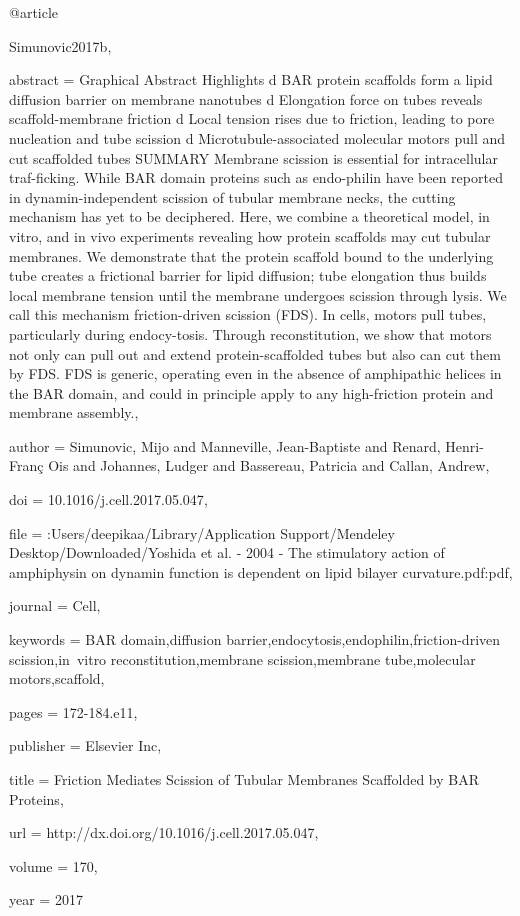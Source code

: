 @article{Simunovic2017b,

abstract = {Graphical Abstract Highlights d BAR protein scaffolds form a lipid diffusion barrier on membrane nanotubes d Elongation force on tubes reveals scaffold-membrane friction d Local tension rises due to friction, leading to pore nucleation and tube scission d Microtubule-associated molecular motors pull and cut scaffolded tubes SUMMARY Membrane scission is essential for intracellular traf-ficking. While BAR domain proteins such as endo-philin have been reported in dynamin-independent scission of tubular membrane necks, the cutting mechanism has yet to be deciphered. Here, we combine a theoretical model, in vitro, and in vivo experiments revealing how protein scaffolds may cut tubular membranes. We demonstrate that the protein scaffold bound to the underlying tube creates a frictional barrier for lipid diffusion; tube elongation thus builds local membrane tension until the membrane undergoes scission through lysis. We call this mechanism friction-driven scission (FDS). In cells, motors pull tubes, particularly during endocy-tosis. Through reconstitution, we show that motors not only can pull out and extend protein-scaffolded tubes but also can cut them by FDS. FDS is generic, operating even in the absence of amphipathic helices in the BAR domain, and could in principle apply to any high-friction protein and membrane assembly.},

author = {Simunovic, Mijo and Manneville, Jean-Baptiste and Renard, Henri-Fran{\c{c}} Ois and Johannes, Ludger and Bassereau, Patricia and Callan, Andrew},

doi = {10.1016/j.cell.2017.05.047},

file = {:Users/deepikaa/Library/Application Support/Mendeley Desktop/Downloaded/Yoshida et al. - 2004 - The stimulatory action of amphiphysin on dynamin function is dependent on lipid bilayer curvature.pdf:pdf},

journal = {Cell},

keywords = {BAR domain,diffusion barrier,endocytosis,endophilin,friction-driven scission,in vitro reconstitution,membrane scission,membrane tube,molecular motors,scaffold},

pages = {172-184.e11},

publisher = {Elsevier Inc},

title = {{Friction Mediates Scission of Tubular Membranes Scaffolded by BAR Proteins}},

url = {http://dx.doi.org/10.1016/j.cell.2017.05.047},

volume = {170},

year = {2017}

}


